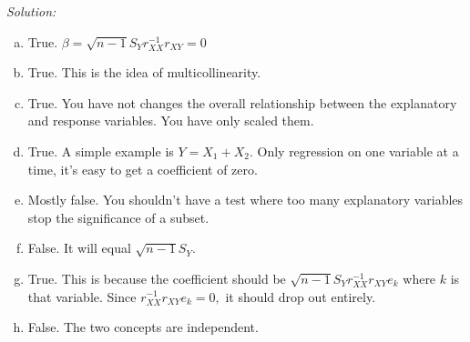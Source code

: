 \documentclass{article}
\newenvironment{solution}
    {\textit{Solution:}}
    {}
\begin{document}
\begin{solution}
\begin{enumerate}[(a)]
\item True. $\beta = \sqrt{n - 1}S_Y r_{XX}^{-1} r_{XY} = 0$
\item True. This is the idea of multicollinearity. 
\item True. You have not changes the overall relationship between the explanatory and response variables. You have only scaled them. 
\item True. A simple example is $Y = X_1 + X_2$. Only regression on one variable at a time, it's easy to get a coefficient of zero. 
\item Mostly false. You shouldn't have a test where too many explanatory variables stop the significance of a subset. 
\item False. It will equal $\sqrt{n - 1}S_Y$. 
\item True. This is because the coefficient should be $\sqrt{n - 1}S_Y r_{XX}^{-1} r_{XY} e_{k}$ where $k$ is that variable. Since $ r_{XX}^{-1}  r_{XY} e_{k} = 0,$ it should drop out entirely. 
\item False. The two concepts are independent. 
\end{enumerate}
\end{solution}
\end{document}

